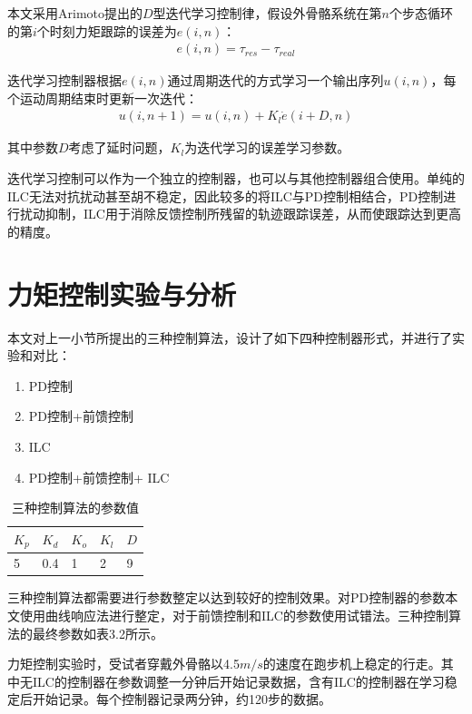 本文采用Arimoto\cite{p47}提出的$D$型迭代学习控制律，假设外骨骼系统在第$n$个步态循环的第$i$个时刻力矩跟踪的误差为$e(i,n)$：
\begin{align}
    e(i,n) = \tau_{res} - \tau_{real}
\end{align}

迭代学习控制器根据$e(i,n)$通过周期迭代的方式学习一个输出序列$u(i,n)$，每个运动周期结束时更新一次迭代：
\begin{align}
    u(i,n+1) = u(i,n) + K_l\dot{e}(i+D,n)
\end{align}

其中参数$D$考虑了延时问题，$K_l$为迭代学习的误差学习参数。

迭代学习控制可以作为一个独立的控制器，也可以与其他控制器组合使用。单纯的ILC无法对抗扰动甚至胡不稳定，因此较多的将ILC与PD控制相结合，PD控制进行扰动抑制，ILC用于消除反馈控制所残留的轨迹跟踪误差，从而使跟踪达到更高的精度。

\section{力矩控制实验与分析}

本文对上一小节所提出的三种控制算法，设计了如下四种控制器形式，并进行了实验和对比：
\begin{enumerate}
    \item PD控制
    \item PD控制+前馈控制
    \item ILC
    \item PD控制+前馈控制+ ILC
\end{enumerate}

\begin{table}[htb]
    \caption[控制参数]{三种控制算法的参数值}
    \begin{tabular}{lllll}
      \toprule
        $K_p$ & $K_d$ & $K_o$ & $K_l$ & $D$ \\
      \midrule
        5 & 0.4 & 1 & 2 & 9 \\
      \bottomrule
    \end{tabular}
\end{table}


三种控制算法都需要进行参数整定以达到较好的控制效果。对PD控制器的参数本文使用曲线响应法进行整定，对于前馈控制和ILC的参数使用试错法。三种控制算法的最终参数如表3.2所示。


力矩控制实验时，受试者穿戴外骨骼以4.5$m/s$的速度在跑步机上稳定的行走。其中无ILC的控制器在参数调整一分钟后开始记录数据，含有ILC的控制器在学习稳定后开始记录。每个控制器记录两分钟，约120步的数据。

